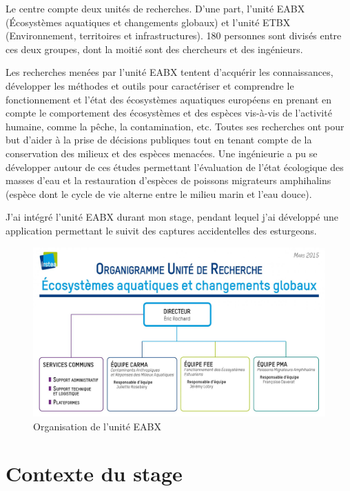 \documentclass[12pt,a4paper,titlepage,twoside]{report}
\begin{document}
	Le centre compte deux unités de recherches. D'une part, l'unité EABX (Écosystèmes aquatiques et changements globaux) et l'unité ETBX (Environnement, territoires et infrastructures). 180 personnes sont divisés entre ces deux groupes, dont la moitié sont des chercheurs et des ingénieurs.
	
	Les recherches menées par l'unité EABX tentent d'acquérir les connaissances, développer les méthodes et outils pour caractériser et comprendre le fonctionnement et l'état des écosystèmes aquatiques européens en prenant en compte le comportement des écosystèmes et des espèces vis-à-vis de l'activité humaine, comme la pêche, la contamination, etc. Toutes ses recherches ont pour but d'aider à la prise de décisions publiques tout en tenant compte de la conservation des milieux et des espèces menacées. Une ingénieurie a pu se développer autour de ces études permettant l'évaluation de l'état écologique des masses d'eau et la restauration d'espèces de poissons migrateurs amphihalins (espèce dont le cycle de vie alterne entre le milieu marin et l'eau douce).\newline

	J'ai intégré l'unité EABX durant mon stage, pendant lequel j'ai développé une application permettant le suivit des captures accidentelles des esturgeons.

\begin{figure}[h]
\centering
\includegraphics[width=\textwidth]{pictures/organigrammeIrstea.jpg}
\caption{Organisation de l'unité EABX}
\end{figure}
\clearpage

\chapter{Contexte du stage}
\end{document}
